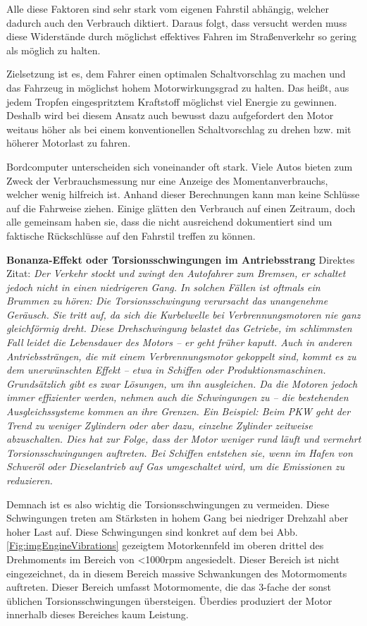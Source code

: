 Alle diese Faktoren sind sehr stark vom eigenen Fahrstil abhängig, welcher dadurch auch den Verbrauch diktiert. Daraus folgt, dass versucht werden muss diese Widerstände durch möglichst effektives Fahren im Straßenverkehr so gering als möglich zu halten.

Zielsetzung ist es, dem Fahrer einen optimalen Schaltvorschlag zu machen und das Fahrzeug in möglichst hohem Motorwirkungsgrad zu halten. Das heißt, aus jedem Tropfen eingespritztem Kraftstoff möglichst viel Energie zu gewinnen. Deshalb wird bei diesem Ansatz auch bewusst dazu aufgefordert den Motor weitaus höher als bei einem konventionellen Schaltvorschlag zu drehen bzw. mit höherer Motorlast zu fahren.
 
Bordcomputer unterscheiden sich voneinander oft stark. Viele Autos bieten zum Zweck der Verbrauchsmessung nur eine Anzeige des Momentanverbrauchs, welcher wenig hilfreich ist. Anhand dieser Berechnungen kann man keine Schlüsse auf die Fahrweise ziehen. Einige glätten den Verbrauch auf einen Zeitraum, doch alle gemeinsam haben sie, dass die nicht ausreichend dokumentiert sind um faktische Rückschlüsse auf den Fahrstil treffen zu können.

\textbf{Bonanza-Effekt oder Torsionsschwingungen im Antriebsstrang\nextline}
Direktes Zitat: \cite{SIMR.CH2-motorwirkungsgrad.Motorschwingungen}
\textit{
\glqq Der Verkehr stockt und zwingt den Autofahrer zum Bremsen, er schaltet jedoch nicht in einen niedrigeren Gang. In solchen Fällen ist oftmals ein Brummen zu hören: Die Torsionsschwingung verursacht das unangenehme Geräusch. Sie tritt auf, da sich die Kurbelwelle bei Verbrennungsmotoren nie ganz gleichförmig dreht. Diese Drehschwingung belastet das Getriebe, im schlimmsten Fall leidet die Lebensdauer des Motors – er geht früher kaputt. Auch in anderen Antriebssträngen, die mit einem Verbrennungsmotor gekoppelt sind, kommt es zu dem unerwünschten Effekt – etwa in Schiffen oder Produktionsmaschinen. Grundsätzlich gibt es zwar Lösungen, um ihn ausgleichen. Da die Motoren jedoch immer effizienter werden, nehmen auch die Schwingungen zu – die bestehenden Ausgleichssysteme kommen an ihre Grenzen. Ein Beispiel: Beim PKW geht der Trend zu weniger Zylindern oder aber dazu, einzelne Zylinder zeitweise abzuschalten. Dies hat zur Folge, dass der Motor weniger rund läuft und vermehrt Torsionsschwingungen auftreten. Bei Schiffen entstehen sie, wenn im Hafen von Schweröl oder Dieselantrieb auf Gas umgeschaltet wird, um die Emissionen zu reduzieren.\grqq} 

Demnach ist es also wichtig die Torsionsschwingungen zu vermeiden. Diese Schwingungen treten am Stärksten in hohem Gang bei niedriger Drehzahl aber hoher Last auf. Diese Schwingungen sind konkret auf dem bei Abb. \ref{Fig:imgEngineVibrations} gezeigtem Motorkennfeld im oberen drittel des Drehmoments im Bereich von <1000rpm angesiedelt. Dieser Bereich ist nicht eingezeichnet, da in diesem Bereich massive Schwankungen des Motormoments auftreten. Dieser Bereich umfasst Motormomente, die das 3-fache der sonst üblichen Torsionsschwingungen übersteigen. Überdies produziert der Motor innerhalb dieses Bereiches kaum Leistung.

